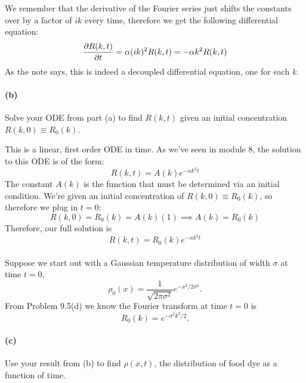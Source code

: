 \documentclass{article}
\begin{document}
\begin{solution}
	We remember that the derivative of the Fourier series just shifts the constants over by a factor 
	of $ik$ every time, therefore we get the following differential equation:
	\[
		\pdv{R(k, t)}{t} = \alpha (ik)^2 R(k, t) = -\alpha k^2 R(k, t)
	\] 
	As the note says, this is indeed a decoupled differential equation, one for each $k$. 
\end{solution}

\paragraph{(b)}
Solve your ODE from part (a) to find $R(k,t)$ given an initial concentration $R(k,0) \equiv R_{0}(k)$.

\begin{solution}
	This is a linear, first order ODE in time. As we've seen in module 8, the solution to this ODE is of 
	the form:
	\[
		R(k, t) = A(k)e^{- \alpha k^2 t}
	\] 
	The constant $A(k)$ is the function that must be determined via an initial condition. We're given an 
	initial concentration of $R(k, 0) \equiv R_0(k)$, so therefore we plug in $t=0$:
	\[
	R(k, 0) = R_0(k) =  A(k)(1) \implies A(k) = R_0(k)
	\] 
	Therefore, our full solution is
	\[
		R(k, t) = R_0(k) e^{-\alpha k^2 t}
	\] 
\end{solution}
\phline
\paragraph{}
Suppose we start out with a Gaussian temperature distribution of width $\sigma$ at time $t=0$,
	\begin{equation*}
		\rho_{0}(x) = \frac{1}{\sqrt{2\pi\sigma^{2}}}e^{-x^{2}/2\sigma^{2}}.
	\end{equation*}
From Problem 9.5(d) we know the Fourier transform at time $t=0$ is
	\begin{equation*}
		R_{0}(k) = e^{-\sigma^{2}k^{2}/2}.
	\end{equation*}

\paragraph{(c)}
Use your result from (b) to find $\rho(x,t)$, the distribution of food dye as a function of time.
\end{document}
